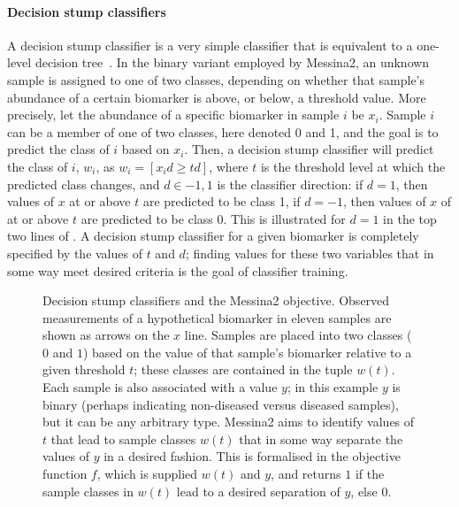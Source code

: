 \documentclass[dissertation.tex]{subfiles}
\begin{document}
\paragraph{Decision stump classifiers}
A decision stump classifier is a very simple classifier that is equivalent to a one-level decision tree~\cite{Iba1992}.  In the binary variant employed by Messina2, an unknown sample is assigned to one of two classes, depending on whether that sample's abundance of a certain biomarker is above, or below, a threshold value.  More precisely, let the abundance of a specific biomarker in sample $i$ be $x_i$.  Sample $i$ can be a member of one of two classes, here denoted 0 and 1, and the goal is to predict the class of $i$ based on $x_i$.  Then, a decision stump classifier will predict the class of $i$, $w_i$, as $w_i = [ x_i d \geq t d ]$, where $t$ is the threshold level at which the predicted class changes, and $d \in {-1, 1}$ is the classifier direction: if $d = 1$, then values of $x$ at or above $t$ are predicted to be class 1, if $d = -1$, then values of $x$ of at or above $t$ are predicted to be class 0.  This is illustrated for $d = 1$ in the top two lines of .  A decision stump classifier for a given biomarker is completely specified by the values of $t$ and $d$; finding values for these two variables that in some way meet desired criteria is the goal of classifier training.

\begin{figure}[!htbp]
\centering
\def\svgwidth{\linewidth} 

\caption[Decision stump classifiers and the Messina2 objective]{Decision stump classifiers and the Messina2 objective.  Observed measurements of a hypothetical biomarker in eleven samples are shown as arrows on the $x$ line.  Samples are placed into two classes ($0$ and $1$) based on the value of that sample's biomarker relative to a given threshold $t$; these classes are contained in the tuple $w(t)$.  Each sample is also associated with a value $y$; in this example $y$ is binary (perhaps indicating non-diseased versus diseased samples), but it can be any arbitrary type.  Messina2 aims to identify values of $t$ that lead to sample classes $w(t)$ that in some way separate the values of $y$ in a desired fashion.  This is formalised in the objective function $f$, which is supplied $w(t)$ and $y$, and returns $1$ if the sample classes in $w(t)$ lead to a desired separation of $y$, else $0$.}\label{fig:mess-thresh-1}
\end{figure}
\end{document}
